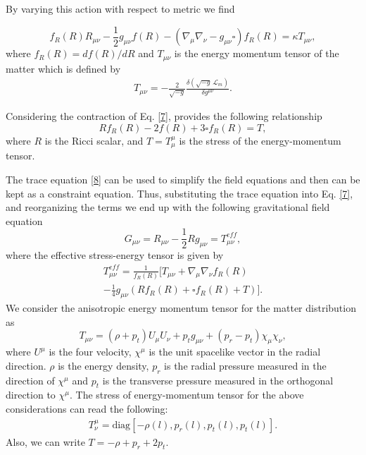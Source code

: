 By varying this action with respect to metric we find

\begin{equation}
\label{7}
f_R(R)R_{\mu\nu}-\frac{1}{2}g_{\mu\nu} f(R)-(\nabla_{\mu}\nabla_{\nu}-g_{\mu\nu}\square)f_R(R)=\kappa T_{\mu\nu},
\end{equation}
where $f_R(R)=df(R)/dR$ and $T_{\mu\nu}$ is the energy momentum tensor of the matter which is defined by
\begin{align*}
T_{\mu\nu}=-\frac{2}{\sqrt{-g}}\frac{\delta\left(\sqrt{-g}\,\mathcal{L}_m\right)}{\delta g^{\mu\nu}}.
\end{align*}

Considering the contraction of Eq. \eqref{7}, provides the following relationship
\begin{equation}
\label{8}
R f_R(R)-2f(R)+3\square f_R(R)=T,
\end{equation}
where $R$ is the Ricci scalar, and $T=T^{\mu}_{\mu}$ is the stress of the energy-momentum tensor.

The trace equation \eqref{8} can be used to simplify the field
equations and then can be kept as a constraint equation.
Thus, substituting the trace equation into Eq. \eqref{7}, and
reorganizing the terms we end up with the following
gravitational field equation
\begin{equation}
\label{9}
G_{\mu\nu}=R_{\mu\nu}-\frac{1}{2}R g_{\mu\nu}=T^{eff}_{\mu\nu},
\end{equation}
where the effective stress-energy tensor is given by
\begin{multline}
\label{10}
T^{eff}_{\mu\nu}=\frac{1}{f_R(R)}\bigg[T_{\mu\nu}+\nabla_{\mu}\nabla_{\nu} f_R(R)\\
-\frac{1}{4}g_{\mu\nu}(Rf_R(R)+\square f_R(R)+T)\bigg].
\end{multline}
We consider the anisotropic energy momentum tensor for the matter distribution as
\begin{equation}
\label{11}
T_{\mu\nu}=(\rho+p_t)U_{\mu}U_{\nu}+p_tg_{\mu\nu}+(p_r-p_t)\chi_{\mu}\chi_{\nu},
\end{equation}
where $U^{\mu}$ is the four velocity, $\chi^{\mu}$ is the unit spacelike vector in the radial direction. $\rho$ is the energy density, $p_r$ is the radial pressure measured in the direction of $\chi^{\mu}$ and $p_t$ is the transverse pressure measured in the orthogonal direction to $\chi^{\mu}$. The stress of energy-momentum tensor for the above considerations can read the following:
\begin{align*}
T^{\mu}_{\nu}=\text{diag}[-\rho(l),p_r(l),p_t(l),p_t(l)].
\end{align*}
Also, we can write $T=-\rho+p_r+2p_t$.


